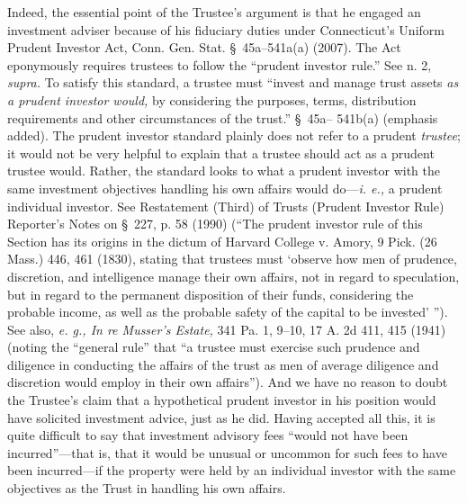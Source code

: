 {  Indeed, the essential point of the Trustee's argument is that he engaged an investment adviser because of his fiduciary duties under Connecticut's Uniform Prudent Investor Act, Conn. Gen. Stat. \S~45a--541a(a) (2007). The Act eponymously requires trustees to follow the ``prudent investor rule.'' See n. 2, \emph{supra.} To satisfy this standard, a trustee must ``invest and manage trust assets \emph{as a prudent investor would,} by considering the purposes, terms, distribution requirements and other circumstances of the trust.'' \S~45a-- 541b(a) (emphasis added). The prudent investor standard plainly does not refer to a prudent \emph{trustee}; it would not be very helpful to explain that a trustee should act as a prudent trustee would. Rather, the standard looks to what a prudent investor with the same investment objectives handling his own affairs would do---\emph{i. e.,} a prudent individual investor. See Restatement (Third) of Trusts (Prudent Investor Rule) Reporter's Notes on \S~227, p. 58 (1990) (``The prudent investor rule of this Section has its origins in the dictum of Harvard College v. Amory, 9 Pick. (26 Mass.) 446, 461 (1830), stating that trustees must ‘observe how men of prudence, discretion, and intelligence manage their own affairs, not in regard to speculation, but in regard to the permanent disposition of their funds, considering the probable income, as well as the probable safety of the capital to be invested' ''). See also, \emph{e. g., In re Musser's Estate,} 341 Pa. 1, 9--10, 17 A. 2d 411, 415 (1941) (noting the ``general rule'' that ``a trustee must exercise such prudence and diligence in conducting the affairs of the trust as men of average diligence and discretion would employ in their own affairs''). And we have no reason to doubt the Trustee's claim that a hypothetical prudent investor in his position would have solicited investment advice, \newpage  just as he did. Having accepted all this, it is quite difficult to say that investment advisory fees ``would not have been incurred''---that is, that it would be unusual or uncommon for such fees to have been incurred---if the property were held by an individual investor with the same objectives as the Trust in handling his own affairs.

}
